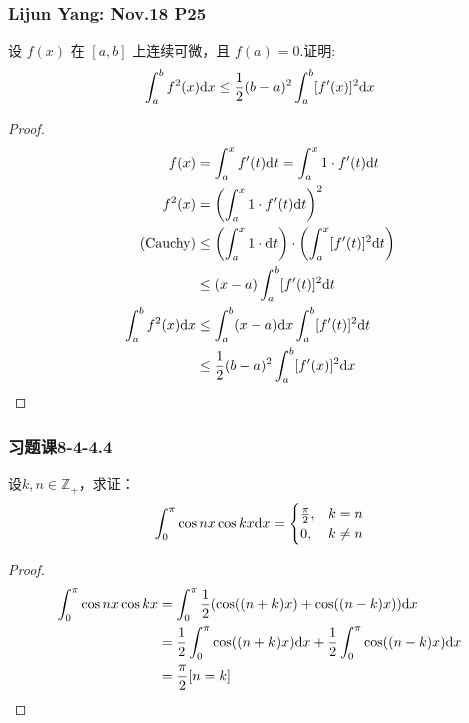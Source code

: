 \documentclass[./main.tex]{subfiles}
\begin{document}
\subsubsection{Lijun Yang: Nov.18 P25}
\noindent 设 $f(x)$ 在 $[a,b]$ 上连续可微，且 $f(a)=0$.证明:
$$\int_a^bf^2(x)\text{d}x\le\frac{1}{2}(b-a)^2\int_a^b[f'(x)]^2\text{d}x$$
\begin{proof}
  \begin{align*}
    f(x)&=\int_a^xf'(t)\text{d}t=\int_a^x1\cdot f'(t)\text{d}t\\
    f^2(x)&=\left(\int_a^x1\cdot f'(t)\text{d}t\right)^2\\
    \text{(Cauchy)}&\le\left(\int_a^x 1\cdot\text{d}t\right)\cdot\left(\int_a^x[f'(t)]^2\text{d}t\right)\\
    &\le (x-a)\int_a^b[f'(t)]^2\text{d}t\\
    \int_a^bf^2(x)\text{d}x&\le\int_a^b(x-a)\text{d}x\int_a^b[f'(t)]^2\text{d}t\\
    &\le \frac{1}{2}(b-a)^2\int_a^b[f'(x)]^2\text{d}x
  \end{align*}
\end{proof}
\subsubsection{习题课8-4-4.4}
\noindent 设$k,n\in \mathbb{Z}_+$，求证：
\begin{eqnarray}
  \int_0^{\pi}\cos nx \cos kx\text{d}x=
  \begin{cases}
    \frac{\pi}{2},&k=n\\0,&k\neq n
  \end{cases}
\end{eqnarray}
\begin{proof}
  \begin{align*}
  \int_0^{\pi}\cos nx \cos kx &=\int_0^{\pi}\frac{1}{2}(\cos((n+k)x)+\cos((n-k)x))\text{d}x\\
  &=\frac{1}{2}\int_0^{\pi}\cos((n+k)x)\text{d}x+\frac{1}{2}\int_0^{\pi}\cos((n-k)x)\text{d}x\\
  &=\frac{\pi}{2}[n=k]
  \end{align*}
\end{proof}
\end{document}
